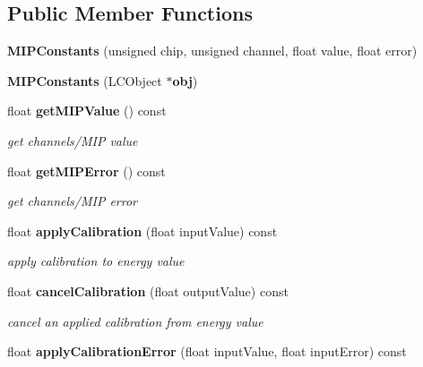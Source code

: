 \subsection*{Public Member Functions}
\begin{DoxyCompactItemize}
\item 
{\bfseries M\-I\-P\-Constants} (unsigned chip, unsigned channel, float value, float error)\label{classCALICE_1_1MIPConstants_a00df4532d023e4daad39bcc0ee5538f4}

\item 
{\bfseries M\-I\-P\-Constants} (L\-C\-Object $\ast${\bf obj})\label{classCALICE_1_1MIPConstants_aec5ab4aecbf0d776c678ec1faee7eb6c}

\item 
float {\bf get\-M\-I\-P\-Value} () const \label{classCALICE_1_1MIPConstants_a81e18faa3e81f04034e750b2db519521}

\begin{DoxyCompactList}\small\item\em get channels/\-M\-I\-P value \end{DoxyCompactList}\item 
float {\bf get\-M\-I\-P\-Error} () const \label{classCALICE_1_1MIPConstants_a518c72090d9dd86b3c14d94c62967d13}

\begin{DoxyCompactList}\small\item\em get channels/\-M\-I\-P error \end{DoxyCompactList}\item 
float {\bf apply\-Calibration} (float input\-Value) const \label{classCALICE_1_1MIPConstants_a1ce8759ffdc72c9975ef2705c08fc4d7}

\begin{DoxyCompactList}\small\item\em apply calibration to energy value \end{DoxyCompactList}\item 
float {\bf cancel\-Calibration} (float output\-Value) const \label{classCALICE_1_1MIPConstants_a601776b7a8e8558d4b54a00ecc981f0f}

\begin{DoxyCompactList}\small\item\em cancel an applied calibration from energy value \end{DoxyCompactList}\item 
float {\bf apply\-Calibration\-Error} (float input\-Value, float input\-Error) const \label{classCALICE_1_1MIPConstants_a7beb08be64e40e822288cf285b5601e0}


\end{DoxyCompactItemize}

